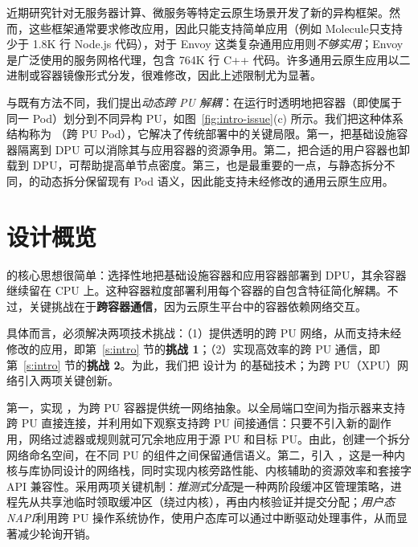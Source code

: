 近期研究针对无服务器计算\cite{10.1145/3503222.3507732}、微服务\cite{234944}等特定云原生场景开发了新的异构框架。然而，这些框架通常要求修改应用，因此只能支持简单应用（例如 Molecule\cite{10.1145/3503222.3507732}只支持少于 1.8K 行 Node.js 代码），对于 Envoy 这类复杂通用应用则\emph{不够实用}；Envoy 是广泛使用的服务网格代理，包含 764K 行 C++ 代码。许多通用云原生应用以二进制或容器镜像形式分发，很难修改，因此上述限制尤为显著。

与既有方法不同，我们提出\emph{动态跨 PU 解耦}：在运行时透明地把容器（即使属于同一 Pod）划分到不同异构 PU，如图~\ref{fig:intro-issue}(c) 所示。我们把这种体系结构称为 \xpod（跨 PU Pod），它解决了传统部署中的关键局限。第一，把基础设施容器隔离到 DPU 可以消除其与应用容器的资源争用。第二，把合适的用户容器也卸载到 DPU，可帮助提高单节点密度。第三，也是最重要的一点，与静态拆分不同，\xpod 的动态拆分保留现有 Pod 语义，因此能支持未经修改的通用云原生应用。

\section{\xpod 设计概览}
\label{s:design-overview}

\xpod 的核心思想很简单：选择性地把基础设施容器和应用容器部署到 DPU，其余容器继续留在 CPU 上。这种容器粒度部署利用每个容器的自包含特征简化解耦。不过，关键挑战在于\textbf{跨容器通信}，因为云原生平台中的容器依赖网络交互。

具体而言，\xpod 必须解决两项技术挑战：（1）提供透明的跨 PU 网络，从而支持未经修改的应用，即第~\ref{s:intro} 节的\textbf{挑战 1}；（2）实现高效率的跨 PU 通信，即第~\ref{s:intro} 节的\textbf{挑战 2}。为此，我们把 \os 设计为 \xpod 的基础技术；\os 为跨 PU（XPU）网络引入两项关键创新。

第一，\os 实现 \giptable，为跨 PU 容器提供统一网络抽象。\giptable 以全局端口空间为指示器来支持跨 PU 直接连接，并利用如下观察支持跨 PU 间接通信：只要不引入新的副作用，网络过滤器或规则就可冗余地应用于源 PU 和目标 PU。由此，\giptable 创建一个拆分网络命名空间，在不同 PU 的组件之间保留通信语义。第二，\os 引入 \gsocket，这是一种内核与库协同设计的网络栈，同时实现内核旁路性能、内核辅助的资源效率和套接字 API 兼容性。\gsocket 采用两项关键机制：\emph{推测式分配}是一种两阶段缓冲区管理策略，进程先从共享池临时领取缓冲区（绕过内核），再由内核验证并提交分配；\emph{用户态 NAPI}利用跨 PU 操作系统协作，使用户态库可以通过中断驱动处理事件，从而显著减少轮询开销。
